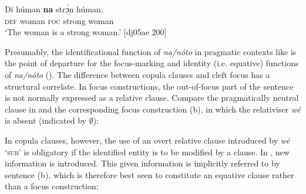 \ea%
    \label{ex:key:695}
\z\z


\ea%
    \label{ex:key:696}
    \gll Di  húman  \textbf{na} strɔ́n  húman.\\
\textsc{def}  woman  \textsc{foc}  strong  woman\\

\glt ‘The woman is a strong woman.’ [dj05ae 200]
\z

Presumably, the identificational function of \textit{na/nóto} in pragmatic contexts like  is the point of departure for the focus-marking and identity (i.e. equative) functions of \textit{na/nóto} (\citealt[96]{HeineKuteva2002}). The difference between copula clauses and cleft focus has a structural correlate. In focus constructions, the out-of-focus part of the sentence is not normally expressed as a relative clause. Compare the pragmatically neutral clause in  and the corresponding focus construction (b), in which the relativiser \textit{wé} is absent (indicated by ${\emptyset}$): 


\ea%
    \label{ex:key:697}
\z\z

In copula clauses, however, the use of an overt relative clause introduced by \textit{wé} ‘\textsc{sub}’ is obligatory if the identified entity is to be modified by a clause. In , new information is introduced. This given information is implicitly referred to by sentence (b), which is therefore best seen to constitute an equative clause rather than a focus construction: 


